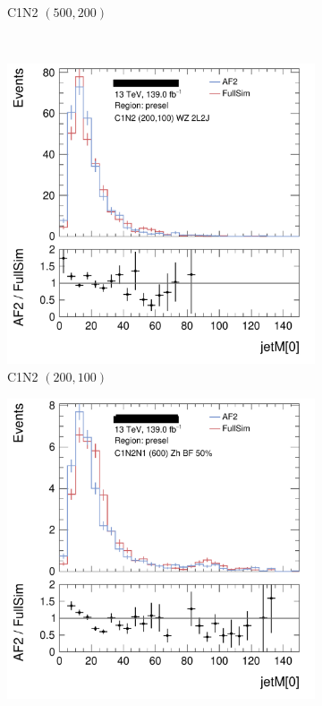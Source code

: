 \begin{figure}[tp]
\begin{subfigure}{0.495\textwidth}
\caption{C1N2 $(500, 200)$}
\end{subfigure}
\\
\centering
\begin{subfigure}{0.495\textwidth}
\includegraphics[width=\textwidth]{figures/2ljets_C1N2_WZ_200p0_100p0_2L2J_presel_jetM[0]_50.png}
\caption{C1N2 $(200, 100)$}
\end{subfigure}
\hfill
\begin{subfigure}{0.495\textwidth}
\centering
\includegraphics[width=\textwidth]{figures/2ljets_C1N2N1_GGMHinoZh50_600_BF50_presel_jetM[0]_62.png}

\end{subfigure}
\end{figure}
